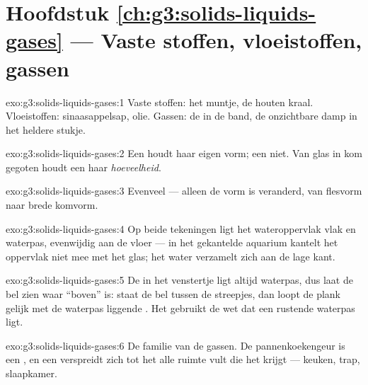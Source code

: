 \section*{Hoofdstuk \ref{ch:g3:solids-liquids-gases} --- Vaste stoffen, vloeistoffen, gassen}

\begin{solution}{exo:g3:solids-liquids-gases:1}
Vaste stoffen: het muntje, de houten kraal. Vloeistoffen:
sinaasappelsap, olie. Gassen: de  in de band, de onzichtbare damp
in het heldere stukje.
\end{solution}

\begin{solution}{exo:g3:solids-liquids-gases:2}
Een  houdt haar eigen vorm; een  niet. Van glas in
kom gegoten houdt een  haar \emph{hoeveelheid}.
\end{solution}

\begin{solution}{exo:g3:solids-liquids-gases:3}
Evenveel --- alleen de vorm is veranderd, van flesvorm naar brede
komvorm.
\end{solution}

\begin{solution}{exo:g3:solids-liquids-gases:4}
Op beide tekeningen ligt het wateroppervlak vlak en waterpas,
evenwijdig aan de vloer --- in het gekantelde aquarium kantelt het
oppervlak niet mee met het glas; het water verzamelt zich aan de lage
kant.
\end{solution}

\begin{solution}{exo:g3:solids-liquids-gases:5}
De  in het venstertje ligt altijd waterpas, dus laat de bel
zien waar ``boven'' is: staat de bel tussen de streepjes, dan loopt de
plank gelijk met de waterpas liggende . Het gebruikt de wet dat
een rustende  waterpas ligt.
\end{solution}

\begin{solution}{exo:g3:solids-liquids-gases:6}
De familie van de gassen. De pannenkoekengeur is een , en een
 verspreidt zich tot het alle ruimte vult die het krijgt ---
keuken, trap, slaapkamer.
\end{solution}


